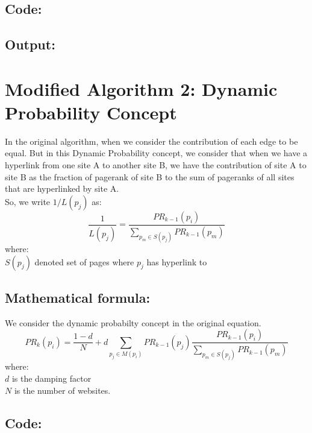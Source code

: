 \documentclass[10pt,a4paper]{article}
\begin{document}
\subsection*{Code:}
\lstset{style=mystyle}


\newpage
\subsection*{Output: }

\lstset{style=mystyle}


\clearpage
\section{Modified Algorithm 2: Dynamic Probability Concept}
In the original algorithm, when we consider the contribution of each edge to be equal. But in this Dynamic Probability concept, we consider that when we have a hyperlink from one site A to another site B, we have the contribution of site A to site B as the fraction of pagerank of site B to the sum of pageranks of all sites that are hyperlinked by site A.\\
So, we write $1/L(p_j)$ as:
\begin{equation}
\frac{1}{L(p_j)} = \frac{PR_{k-1}(p_i)}{\sum_{p_m \in S(p_j)}{PR_{k-1}(p_m)}}
\end{equation}
where:\\
    $S(p_j)$ denoted set of pages where $p_j$ has hyperlink to\\\subsection*{Mathematical formula: }
We consider the dynamic probabilty concept in the original equation.\\
\begin{equation}
PR_k(p_i) = \frac{1-d}{N} + d \sum_{p_j \in M(p_i)}{PR_{k-1}(p_j)}\frac{PR_{k-1}(p_i)}{\sum_{p_m \in S(p_j)}{PR_{k-1}(p_m)}}
\end{equation}
where:\\ 
    $d$ is the damping factor\\
    $N$ is the number of websites.

\subsection*{Code:}
\lstset{style=mystyle}

\newpage
\end{document}

